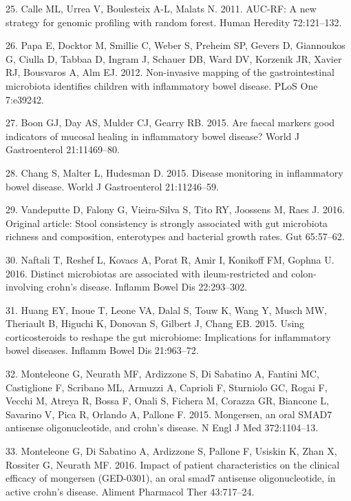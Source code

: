 \documentclass[11pt,]{article}
\begin{document}
\hypertarget{ref-calle_aucrf_2011}{}
25. Calle ML, Urrea V, Boulesteix A-L, Malats N. 2011. AUC-RF: A new
strategy for genomic profiling with random forest. Human Heredity
72:121--132.

\hypertarget{ref-papa_pedsIBD_2012}{}
26. Papa E, Docktor M, Smillie C, Weber S, Preheim SP, Gevers D,
Giannoukos G, Ciulla D, Tabbaa D, Ingram J, Schauer DB, Ward DV,
Korzenik JR, Xavier RJ, Bousvaros A, Alm EJ. 2012. Non-invasive mapping
of the gastrointestinal microbiota identifies children with inflammatory
bowel disease. PLoS One 7:e39242.

\hypertarget{ref-boon_fmarkers_2015}{}
27. Boon GJ, Day AS, Mulder CJ, Gearry RB. 2015. Are faecal markers good
indicators of mucosal healing in inflammatory bowel disease? World J
Gastroenterol 21:11469--80.

\hypertarget{ref-chang_monitoring_2015}{}
28. Chang S, Malter L, Hudesman D. 2015. Disease monitoring in
inflammatory bowel disease. World J Gastroenterol 21:11246--59.

\hypertarget{ref-vandeputte_stoolcon_2016}{}
29. Vandeputte D, Falony G, Vieira-Silva S, Tito RY, Joossens M, Raes J.
2016. Original article: Stool consistency is strongly associated with
gut microbiota richness and composition, enterotypes and bacterial
growth rates. Gut 65:57--62.

\hypertarget{ref-naftali_tissinvol_2016}{}
30. Naftali T, Reshef L, Kovacs A, Porat R, Amir I, Konikoff FM, Gophna
U. 2016. Distinct microbiotas are associated with ileum-restricted and
colon-involving crohn's disease. Inflamm Bowel Dis 22:293--302.

\hypertarget{ref-huang_cort_2015}{}
31. Huang EY, Inoue T, Leone VA, Dalal S, Touw K, Wang Y, Musch MW,
Theriault B, Higuchi K, Donovan S, Gilbert J, Chang EB. 2015. Using
corticosteroids to reshape the gut microbiome: Implications for
inflammatory bowel diseases. Inflamm Bowel Dis 21:963--72.

\hypertarget{ref-monteleone_mongersen_2015}{}
32. Monteleone G, Neurath MF, Ardizzone S, Di Sabatino A, Fantini MC,
Castiglione F, Scribano ML, Armuzzi A, Caprioli F, Sturniolo GC, Rogai
F, Vecchi M, Atreya R, Bossa F, Onali S, Fichera M, Corazza GR, Biancone
L, Savarino V, Pica R, Orlando A, Pallone F. 2015. Mongersen, an oral
SMAD7 antisense oligonucleotide, and crohn's disease. N Engl J Med
372:1104--13.

\hypertarget{ref-monteleone_mongersen_2016}{}
33. Monteleone G, Di Sabatino A, Ardizzone S, Pallone F, Usiskin K, Zhan
X, Rossiter G, Neurath MF. 2016. Impact of patient characteristics on
the clinical efficacy of mongersen (GED-0301), an oral smad7 antisense
oligonucleotide, in active crohn's disease. Aliment Pharmacol Ther
43:717--24.
\end{document}
